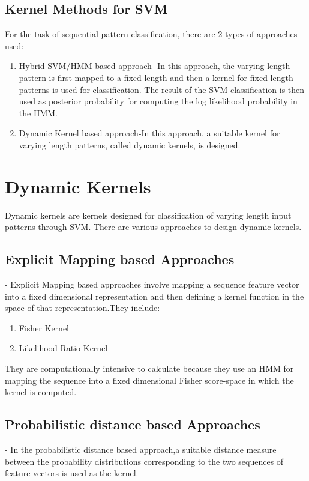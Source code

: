\subsection{Kernel Methods for SVM}
For the task of sequential pattern classification, there are 2 types of approaches used:-
\begin{enumerate}
\item Hybrid SVM/HMM based approach- In this approach, the varying length pattern is first mapped to a fixed length and then a kernel for fixed length patterns is used for classification. The result of the SVM classification is then used as posterior probability for computing the log likelihood probability in the HMM.
\item Dynamic Kernel based approach-In this approach, a suitable kernel for varying length patterns, called dynamic kernels, is designed. 
\end{enumerate}

\section{Dynamic Kernels}
Dynamic kernels are kernels designed for classification of varying length input patterns through SVM. There are various approaches to design dynamic kernels.

\subsection{Explicit Mapping based Approaches}-
Explicit Mapping based approaches involve mapping a sequence feature vector into a fixed dimensional representation and then defining a kernel function in the space of that representation.They include:-
\begin{enumerate}
\item Fisher Kernel
\item Likelihood Ratio Kernel
\end{enumerate}
They are computationally intensive to calculate because they use an HMM for mapping the sequence into a fixed dimensional Fisher score-space in which the kernel is computed.


\subsection{Probabilistic distance based Approaches}-
In the probabilistic distance based approach,a suitable distance measure between the probability distributions corresponding to the two sequences of
feature vectors is used as the kernel.


